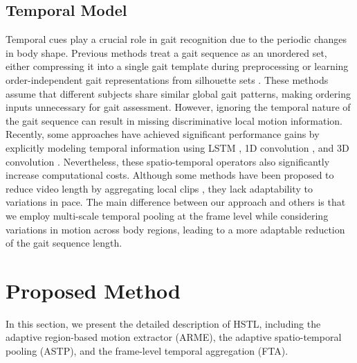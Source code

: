\documentclass[10pt,twocolumn,letterpaper]{article}
\begin{document}
\subsection{Temporal Model}
Temporal cues play a crucial role in gait recognition due to the periodic changes in body shape. Previous methods treat a gait sequence as an unordered set, either compressing it into a single gait template during preprocessing \cite{shiraga2016geinet,li2020gait} or learning order-independent gait representations from silhouette sets \cite{chao2019gaitset,hou2020gait,hou2021set}. These methods assume that different subjects share similar global gait patterns, making ordering inputs unnecessary for gait assessment. However, ignoring the temporal nature of the gait sequence can result in missing discriminative local motion information. Recently, some approaches have achieved significant performance gains by explicitly modeling temporal information using LSTM \cite{zhang2019cross}, 1D convolution \cite{huang2021context}, and 3D convolution \cite{lin2020gait,huang20213d}. Nevertheless, these spatio-temporal operators also significantly increase computational costs. Although
 some methods have been proposed to reduce video length by aggregating local clips \cite{lin2021gait,lin2021gaitmask,chai2022lagrange}, they lack adaptability to variations in pace. The main difference between our approach and others \cite{li2019selective,hou2021bicnet} is that we employ multi-scale temporal pooling at the frame level while considering variations in motion across body regions, leading to a more adaptable reduction of the gait sequence length.



\section{Proposed Method}
\label{sec:method}
In this section, we present the detailed description of HSTL, including the adaptive region-based motion extractor (ARME), the adaptive spatio-temporal pooling (ASTP), and the frame-level temporal aggregation (FTA).
\end{document}
